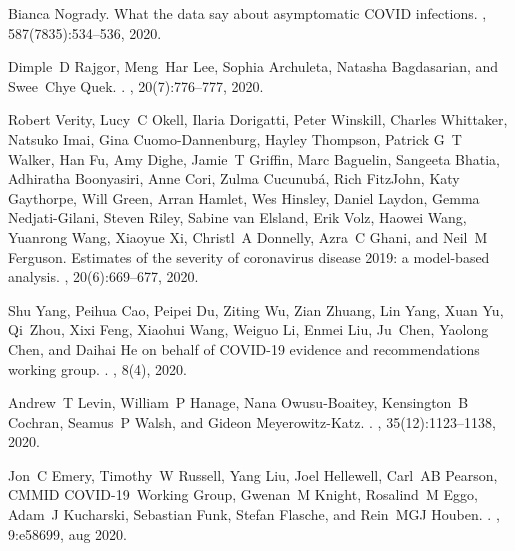 \documentclass[12pt]{article}
\begin{document}
\begin{thebibliography}{10}

Bianca Nogrady.
\newblock What the data say about asymptomatic {COVID} infections.
, 587(7835):534--536, 2020.

Dimple~D Rajgor, Meng~Har Lee, Sophia Archuleta, Natasha Bagdasarian, and
  Swee~Chye Quek.
.
, 20(7):776--777, 2020.

Robert Verity, Lucy~C Okell, Ilaria Dorigatti, Peter Winskill, Charles
  Whittaker, Natsuko Imai, Gina Cuomo-Dannenburg, Hayley Thompson, Patrick G~T
  Walker, Han Fu, Amy Dighe, Jamie~T Griffin, Marc Baguelin, Sangeeta Bhatia,
  Adhiratha Boonyasiri, Anne Cori, Zulma Cucunubá, Rich FitzJohn, Katy
  Gaythorpe, Will Green, Arran Hamlet, Wes Hinsley, Daniel Laydon, Gemma
  Nedjati-Gilani, Steven Riley, Sabine {van Elsland}, Erik Volz, Haowei Wang,
  Yuanrong Wang, Xiaoyue Xi, Christl~A Donnelly, Azra~C Ghani, and Neil~M
  Ferguson.
\newblock Estimates of the severity of coronavirus disease 2019: a model-based
  analysis.
, 20(6):669--677, 2020.

Shu Yang, Peihua Cao, Peipei Du, Ziting Wu, Zian Zhuang, Lin Yang, Xuan Yu,
  Qi~Zhou, Xixi Feng, Xiaohui Wang, Weiguo Li, Enmei Liu, Ju~Chen, Yaolong
  Chen, and {Daihai He on behalf of COVID-19 evidence and recommendations
  working group}.
.
, 8(4), 2020.

Andrew~T Levin, William~P Hanage, Nana Owusu-Boaitey, Kensington~B Cochran,
  Seamus~P Walsh, and Gideon Meyerowitz-Katz.
.
, 35(12):1123--1138, 2020.

Jon~C Emery, Timothy~W Russell, Yang Liu, Joel Hellewell, Carl~AB Pearson,
  CMMID COVID-19~Working Group, Gwenan~M Knight, Rosalind~M Eggo, Adam~J
  Kucharski, Sebastian Funk, Stefan Flasche, and Rein~MGJ Houben.
.
, 9:e58699, aug 2020.


\end{thebibliography}
\end{document}
